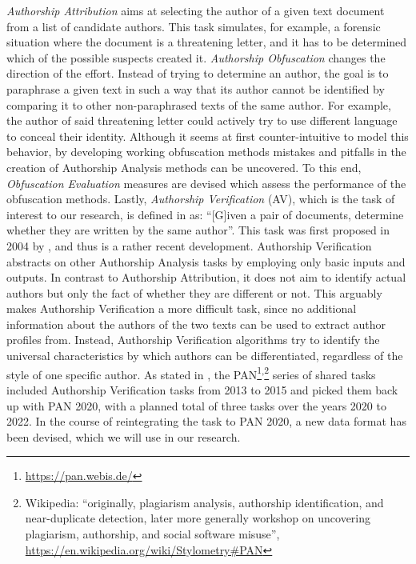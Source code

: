 \textit{Authorship Attribution} aims at selecting the author of a given text document from a list of candidate authors.
This task simulates, for example, a forensic situation where the document is a threatening letter, and it has to be determined which of the possible suspects created it.
\textit{Authorship Obfuscation} changes the direction of the effort.
Instead of trying to determine an author, the goal is to paraphrase a given text in such a way that its author cannot be identified by comparing it to other non-paraphrased texts of the same author.
For example, the author of said threatening letter could actively try to use different language to conceal their identity.
Although it seems at first counter-intuitive to model this behavior, by developing working obfuscation methods mistakes and pitfalls in the creation of Authorship Analysis methods can be uncovered.
To this end, \textit{Obfuscation Evaluation} measures are devised which assess the performance of the obfuscation methods.
Lastly, \textit{Authorship Verification} (AV), which is the task of interest to our research, is defined in \cite{stein2019unbiasedGutenbergCorpus} as: ``[G]iven a pair of documents, determine whether they are written by the same author''.
This task was first proposed in 2004 by \citeauthor{koppel2004unmasking}, and thus is a rather recent development.
Authorship Verification abstracts on other Authorship Analysis tasks by employing only basic inputs and outputs.
In contrast to Authorship Attribution, it does not aim to identify actual authors but only the fact of whether they are different or not.
This arguably makes Authorship Verification a more difficult task, since no additional information about the authors of the two texts can be used to extract author profiles from.
Instead, Authorship Verification algorithms try to identify the universal characteristics by which authors can be differentiated, regardless of the style of one specific author.
As stated in \cite{bevendorff2020shared}, the PAN\footnote{\url{https://pan.webis.de/}}\textsuperscript{,}\footnote{Wikipedia: ``originally, plagiarism analysis, authorship identification, and near-duplicate detection, later more generally workshop on uncovering plagiarism, authorship, and social software misuse'', \url{https://en.wikipedia.org/wiki/Stylometry\#PAN}} series of shared tasks included Authorship Verification tasks from 2013 to 2015 and picked them back up with PAN 2020, with a planned total of three tasks over the years 2020 to 2022.
In the course of reintegrating the task to PAN 2020, a new data format has been devised, which we will use in our research.

